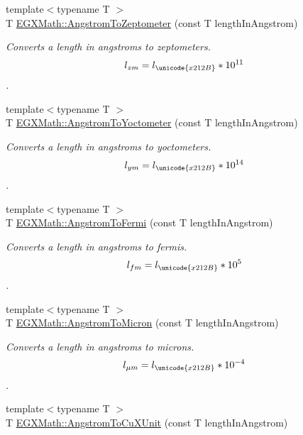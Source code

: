 \begin{DoxyCompactItemize}
{\footnotesize template$<$typename T $>$ }\\T \mbox{\hyperlink{group___e_g_x_math-_conversions-_length_conversions-_non-_s_i-_angstrom-_s_i_ga2516c0f4dedd31c3803c05f4add3fa13}{E\+G\+X\+Math\+::\+Angstrom\+To\+Zeptometer}} (const T length\+In\+Angstrom)
\begin{DoxyCompactList}\small\item\em Converts a length in angstroms to zeptometers. \[ l_{zm}=l_{\unicode{x212B}} * 10^{11} \]. \end{DoxyCompactList}\item 
{\footnotesize template$<$typename T $>$ }\\T \mbox{\hyperlink{group___e_g_x_math-_conversions-_length_conversions-_non-_s_i-_angstrom-_s_i_ga3e889736a84a54f24aa20e218527521d}{E\+G\+X\+Math\+::\+Angstrom\+To\+Yoctometer}} (const T length\+In\+Angstrom)
\begin{DoxyCompactList}\small\item\em Converts a length in angstroms to yoctometers. \[ l_{ym}=l_{\unicode{x212B}} * 10^{14} \]. \end{DoxyCompactList}\item 
{\footnotesize template$<$typename T $>$ }\\T \mbox{\hyperlink{group___e_g_x_math-_conversions-_length_conversions-_non-_s_i-_angstrom-_non-_s_i_ga651864e5c83caf88847a00a0b459eaa2}{E\+G\+X\+Math\+::\+Angstrom\+To\+Fermi}} (const T length\+In\+Angstrom)
\begin{DoxyCompactList}\small\item\em Converts a length in angstroms to fermis. \[ l_{fm}=l_{\unicode{x212B}} * 10^{5} \]. \end{DoxyCompactList}\item 
{\footnotesize template$<$typename T $>$ }\\T \mbox{\hyperlink{group___e_g_x_math-_conversions-_length_conversions-_non-_s_i-_angstrom-_non-_s_i_ga097787c82296d2767637cd15101ec272}{E\+G\+X\+Math\+::\+Angstrom\+To\+Micron}} (const T length\+In\+Angstrom)
\begin{DoxyCompactList}\small\item\em Converts a length in angstroms to microns. \[ l_{\mu m}=l_{\unicode{x212B}} * 10^{-4} \]. \end{DoxyCompactList}\item 
{\footnotesize template$<$typename T $>$ }\\T \mbox{\hyperlink{group___e_g_x_math-_conversions-_length_conversions-_non-_s_i-_angstrom-_non-_s_i_gaf42d486942a8441d13065d8e13661ec6}{E\+G\+X\+Math\+::\+Angstrom\+To\+Cu\+X\+Unit}} (const T length\+In\+Angstrom)

\end{DoxyCompactItemize}
